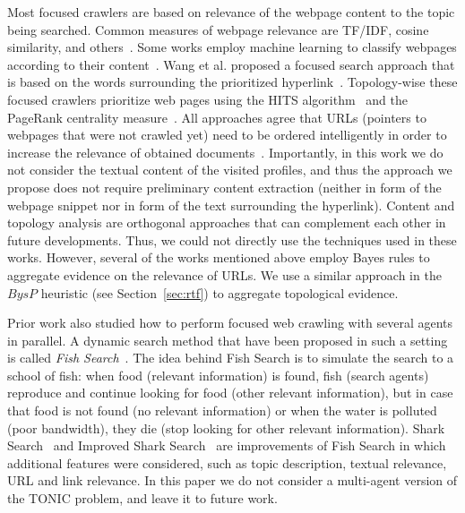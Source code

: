 \documentclass[journal]{IEEEtran}
\begin{document}
Most focused crawlers are based on relevance of the webpage content to the topic being searched. Common measures of webpage relevance are TF/IDF, cosine similarity, and others~\cite{diligenti2000focused,menczer2001evaluating}. 
Some works employ machine learning to classify webpages according to their content~\cite{chakrabarti1999focused}. 
Wang et al. proposed a focused search approach that is based on the words surrounding the prioritized hyperlink~\cite{wang2010focused}.  
Topology-wise these focused crawlers prioritize web pages using the HITS algorithm~\cite{kleinberg1999authoritative} and the PageRank centrality measure~\cite{almpanidis2007combining}. 
All approaches agree that URLs (pointers to webpages that were not crawled yet) need to be ordered intelligently in order to increase the relevance of obtained documents~\cite{cho1998efficient}. Importantly, in this work we do not consider the textual content of the visited profiles, and thus the approach we propose does not require preliminary content extraction (neither in form of the webpage snippet nor in form of the text surrounding the hyperlink). 
Content and topology analysis are orthogonal approaches that can complement each other in future developments. Thus, we could not directly use the techniques used in these works. However, several of the works mentioned above employ Bayes rules to aggregate evidence on the relevance of URLs. We use a similar approach in the \(BysP\) heuristic (see Section~\ref{sec:rtf}) to aggregate topological evidence. 


Prior work also studied how to perform focused web crawling with several agents in parallel. A dynamic search method that have been proposed in such a setting is called {\em Fish Search}~\cite{de1994searching}. The idea behind Fish Search is to simulate the search to a school of fish: when food (relevant information) is found, fish (search agents) reproduce and continue looking for food (other relevant information), but in case that food is not found (no relevant information) or when the water is polluted (poor bandwidth), they die (stop looking for other relevant information). Shark Search~\cite{hersovici1998shark} and Improved Shark Search~\cite{chen2007improved} are improvements of Fish Search in which additional features were considered, such as topic description, textual relevance, URL and link relevance. 
In this paper we do not consider a multi-agent version of the TONIC problem, and leave it to future work. 
\end{document}
